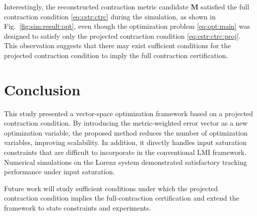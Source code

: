\documentclass{ifacconf}
\newcommand*{\mm}[1]{\boldsymbol{#1}} %
\begin{document}

Interestingly, the reconstructed contraction metric candidate $\mm{M}$ satisfied the full contraction condition \eqref{eq:cstr:ctrc} during the simulation, as shown in Fig.~\ref{fig:sim:result:opt}, even though the optimization problem \eqref{eq:opt:main} was designed to satisfy only the projected contraction condition \eqref{eq:cstr:ctrc:proj}.
This observation suggests that there may exist sufficient conditions for the projected contraction condition to imply the full contraction certification.

\section{Conclusion} \label{sec:conclusion}

This study presented a vector-space optimization framework based on a projected contraction condition.
By introducing the metric-weighted error vector as a new optimization variable, the proposed method reduces the number of optimization variables, improving scalability.
In addition, it directly handles input saturation constraints that are difficult to incorporate in the conventional LMI framework.
Numerical simulations on the Lorenz system demonstrated satisfactory tracking performance under input saturation.

Future work will study sufficient conditions under which the projected contraction condition implies the full-contraction certification and extend the framework to state constraints and experiments.


\end{document}
